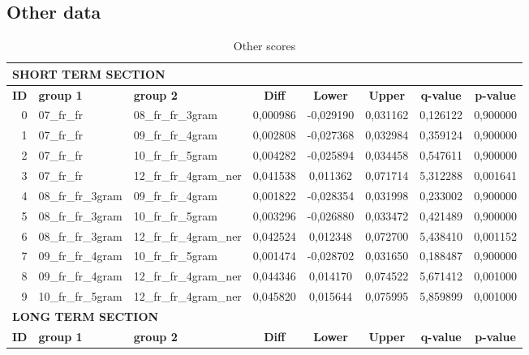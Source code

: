 \subsection{Other data} %
\begin{table}[h!]
    \centering
    \caption{Other scores}
    \label{tab:other_scores}
    \begin{tabular}{|r|l|l||c|c|c|c|c|}
    \hline
        \multicolumn{8}{|l|}{\textbf{SHORT TERM SECTION}} \\ \hline\hline
        \textbf{ID} & \textbf{group 1} & \textbf{group 2} & \textbf{Diff} & \textbf{Lower} & \textbf{Upper} & \textbf{q-value} & \textbf{p-value} \\ \hline
        0 & 07\_fr\_fr & 08\_fr\_fr\_3gram & 0,000986 & -0,029190 & 0,031162 & 0,126122 & 0,900000 \\ \hline
        1 & 07\_fr\_fr & 09\_fr\_fr\_4gram & 0,002808 & -0,027368 & 0,032984 & 0,359124 & 0,900000 \\ \hline
        2 & 07\_fr\_fr & 10\_fr\_fr\_5gram & 0,004282 & -0,025894 & 0,034458 & 0,547611 & 0,900000 \\ \hline
        3 & 07\_fr\_fr & 12\_fr\_fr\_4gram\_ner & 0,041538 & 0,011362 & 0,071714 & 5,312288 & 0,001641 \\ \hline
        4 & 08\_fr\_fr\_3gram & 09\_fr\_fr\_4gram & 0,001822 & -0,028354 & 0,031998 & 0,233002 & 0,900000 \\ \hline
        5 & 08\_fr\_fr\_3gram & 10\_fr\_fr\_5gram & 0,003296 & -0,026880 & 0,033472 & 0,421489 & 0,900000 \\ \hline
        6 & 08\_fr\_fr\_3gram & 12\_fr\_fr\_4gram\_ner & 0,042524 & 0,012348 & 0,072700 & 5,438410 & 0,001152 \\ \hline
        7 & 09\_fr\_fr\_4gram & 10\_fr\_fr\_5gram & 0,001474 & -0,028702 & 0,031650 & 0,188487 & 0,900000 \\ \hline
        8 & 09\_fr\_fr\_4gram & 12\_fr\_fr\_4gram\_ner & 0,044346 & 0,014170 & 0,074522 & 5,671412 & 0,001000 \\ \hline
        9 & 10\_fr\_fr\_5gram & 12\_fr\_fr\_4gram\_ner & 0,045820 & 0,015644 & 0,075995 & 5,859899 & 0,001000 \\ \hline\hline
        \multicolumn{8}{|l|}{\textbf{LONG TERM SECTION}} \\ \hline\hline
        \textbf{ID} & \textbf{group 1} & \textbf{group 2} & \textbf{Diff} & \textbf{Lower} & \textbf{Upper} & \textbf{q-value} & \textbf{p-value} \\ \hline

\end{tabular}
\end{table}
